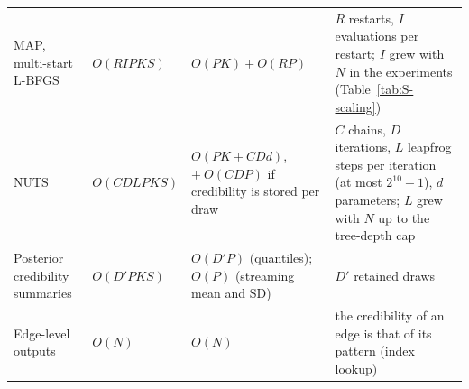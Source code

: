 \begin{table}[htbp]
\begin{tabular}{@{}p{2.8cm}p{3.2cm}p{3.3cm}p{4.6cm}@{}}
\parbox[t]{2.8cm}{\raggedright MAP, multi-start L-BFGS\strut} & \parbox[t]{3.2cm}{\raggedright\footnotesize $O(RIPKS)$\strut} & \parbox[t]{3.3cm}{\raggedright\footnotesize $O(PK)+O(RP)$\strut} & \parbox[t]{4.6cm}{\raggedright\scriptsize $R$ restarts, $I$ evaluations per restart; $I$ grew with $N$ in the experiments (Table~\ref{tab:S-scaling})\strut} \\
\parbox[t]{2.8cm}{\raggedright NUTS\strut} & \parbox[t]{3.2cm}{\raggedright\footnotesize $O(CDLPKS)$\strut} & \parbox[t]{3.3cm}{\raggedright\footnotesize $O(PK + CDd)$, $+\ O(CDP)$ if credibility is stored per draw\strut} & \parbox[t]{4.6cm}{\raggedright\scriptsize $C$ chains, $D$ iterations, $L$ leapfrog steps per iteration (at most $2^{10}-1$), $d$ parameters; $L$ grew with $N$ up to the tree-depth cap\strut} \\
\parbox[t]{2.8cm}{\raggedright Posterior credibility summaries\strut} & \parbox[t]{3.2cm}{\raggedright\footnotesize $O(D'PKS)$\strut} & \parbox[t]{3.3cm}{\raggedright\footnotesize $O(D'P)$ (quantiles); $O(P)$ (streaming mean and SD)\strut} & \parbox[t]{4.6cm}{\raggedright\scriptsize $D'$ retained draws\strut} \\
\parbox[t]{2.8cm}{\raggedright Edge-level outputs\strut} & \parbox[t]{3.2cm}{\raggedright\footnotesize $O(N)$\strut} & \parbox[t]{3.3cm}{\raggedright\footnotesize $O(N)$\strut} & \parbox[t]{4.6cm}{\raggedright\scriptsize the credibility of an edge is that of its pattern (index lookup)\strut} \\
\bottomrule
\end{tabular}
\end{table}

